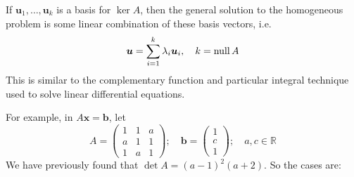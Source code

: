 \documentclass{article}
\begin{document}
	If $\bm u_1, \dots, \bm u_k$ is a basis for $\ker A$, then the general solution to the homogeneous problem is some linear combination of these basis vectors, i.e.
	\[ \bm u = \sum_{i=1}^k \lambda_i \bm u_i,\quad k = \operatorname{null} A \]
	This is similar to the complementary function and particular integral technique used to solve linear differential equations.

	For example, in $A\bm x = \bm b$, let
	\[ A = \begin{pmatrix}
		1 & 1 & a \\ a & 1 & 1 \\ 1 & a & 1
	\end{pmatrix};\quad \bm b = \begin{pmatrix}
		1 \\ c \\ 1
	\end{pmatrix};\quad a, c \in \mathbb R \]
	We have previously found that $\det A = (a-1)^2(a+2)$. So the cases are:
\end{document}
